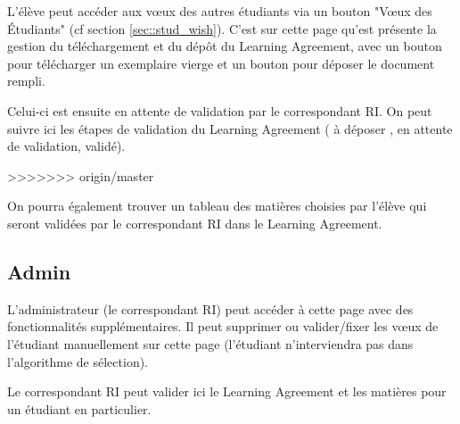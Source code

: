 L'élève peut accéder aux vœux des autres étudiants via un bouton "Vœux des Étudiants" (cf section \ref{sec::stud_wish}).
C'est sur cette page qu'est présente la gestion du téléchargement et du dépôt du Learning Agreement, avec un bouton pour télécharger un exemplaire vierge et un bouton pour déposer le document rempli.

Celui-ci est ensuite en attente de validation par le correspondant RI. On peut suivre ici les étapes de validation du Learning Agreement ( \og à déposer\fg{} , \og en attente de validation\fg{}, \og validé\fg{}).

>>>>>>> origin/master
\bigbreak

On pourra également trouver un tableau des matières choisies par l'élève qui seront validées par le correspondant RI dans le Learning Agreement.

\subsection{Admin}

L'administrateur (le correspondant RI) peut accéder à cette page avec des fonctionnalités supplémentaires.
Il peut supprimer ou valider/fixer les vœux de l'étudiant manuellement sur cette page (l'étudiant n'interviendra pas dans l'algorithme de sélection).

Le correspondant RI peut valider ici le Learning Agreement et les matières pour un étudiant en particulier.

